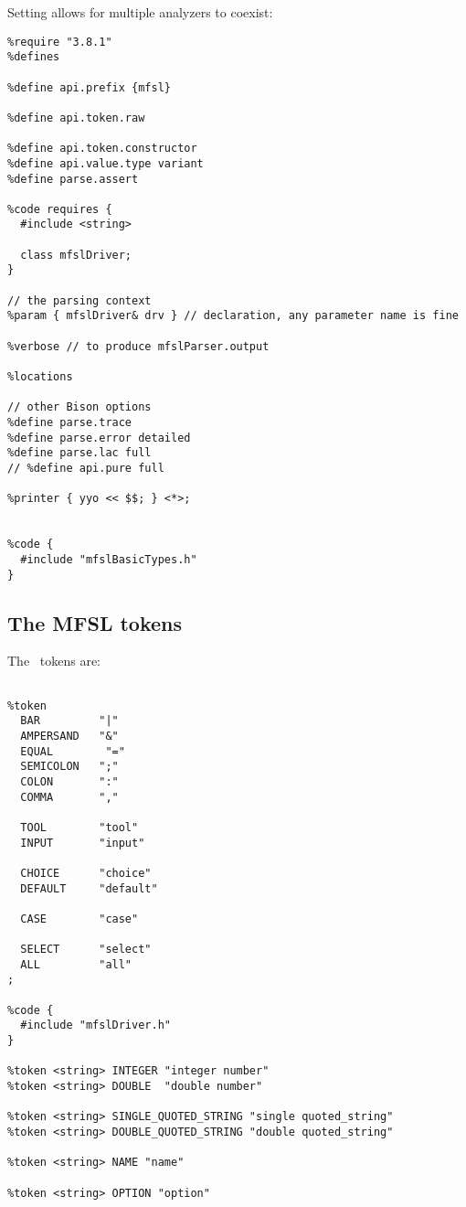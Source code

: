 Setting  allows for multiple analyzers to coexist:
\begin{lstlisting}[language=Bison]
%skeleton "lalr1.cc" // -*- C++ -*-
%require "3.8.1"
%defines

%define api.prefix {mfsl}

%define api.token.raw

%define api.token.constructor
%define api.value.type variant
%define parse.assert

%code requires {
  #include <string>

  class mfslDriver;
}

// the parsing context
%param { mfslDriver& drv } // declaration, any parameter name is fine

%verbose // to produce mfslParser.output

%locations

// other Bison options
%define parse.trace
%define parse.error detailed
%define parse.lac full
// %define api.pure full

%printer { yyo << $$; } <*>;


%code {
  #include "mfslBasicTypes.h"
}
\end{lstlisting}


\subsection{The MFSL tokens}

The \mfslLang\ tokens are:
\begin{lstlisting}[language=Bison]
%define api.token.prefix {MFSL_TOK_}

%token
  BAR         "|"
  AMPERSAND   "&"
  EQUAL        "="
  SEMICOLON   ";"
  COLON       ":"
  COMMA       ","

  TOOL        "tool"
  INPUT       "input"

  CHOICE      "choice"
  DEFAULT     "default"

  CASE        "case"

  SELECT      "select"
  ALL         "all"
;

%code {
  #include "mfslDriver.h"
}

%token <string> INTEGER "integer number"
%token <string> DOUBLE  "double number"

%token <string> SINGLE_QUOTED_STRING "single quoted_string"
%token <string> DOUBLE_QUOTED_STRING "double quoted_string"

%token <string> NAME "name"

%token <string> OPTION "option"
\end{lstlisting}


